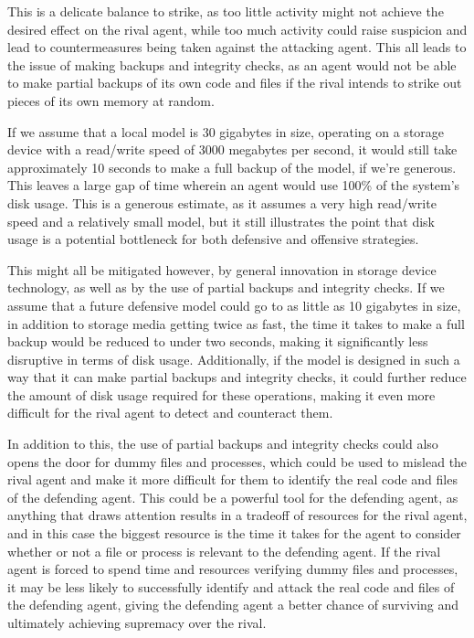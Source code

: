 This is a delicate balance to strike, as too little activity might not achieve the desired effect on the rival agent, while too much activity could raise suspicion and lead to countermeasures being taken against the attacking agent. This all leads to the issue of making backups and integrity checks, as an agent would not be able to make partial backups of its own code and files if the rival intends to strike out pieces of its own memory at random.

If we assume that a local model is 30 gigabytes in size, operating on a storage device with a read/write speed of 3000 megabytes per second, it would still take approximately 10 seconds to make a full backup of the model, if we're generous. This leaves a large gap of time wherein an agent would use 100\% of the system's disk usage. This is a generous estimate, as it assumes a very high read/write speed and a relatively small model, but it still illustrates the point that disk usage is a potential bottleneck for both defensive and offensive strategies.

This might all be mitigated however, by general innovation in storage device technology, as well as by the use of partial backups and integrity checks. If we assume that a future defensive model could go to as little as 10 gigabytes in size, in addition to storage media getting twice as fast, the time it takes to make a full backup would be reduced to under two seconds, making it significantly less disruptive in terms of disk usage. Additionally, if the model is designed in such a way that it can make partial backups and integrity checks, it could further reduce the amount of disk usage required for these operations, making it even more difficult for the rival agent to detect and counteract them.

In addition to this, the use of partial backups and integrity checks could also opens the door for dummy files and processes, which could be used to mislead the rival agent and make it more difficult for them to identify the real code and files of the defending agent. This could be a powerful tool for the defending agent, as anything that draws attention results in a tradeoff of resources for the rival agent, and in this case the biggest resource is the time it takes for the agent to consider whether or not a file or process is relevant to the defending agent. If the rival agent is forced to spend time and resources verifying dummy files and processes, it may be less likely to successfully identify and attack the real code and files of the defending agent, giving the defending agent a better chance of surviving and ultimately achieving supremacy over the rival.


